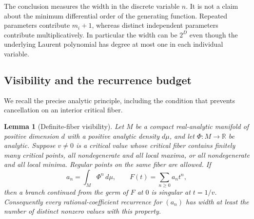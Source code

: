 \documentclass[11pt,a4paper]{article}
\newtheorem{lemma}[theorem]{Lemma}
\theoremstyle{definition}
\theoremstyle{remark}
\numberwithin{equation}{section}
\begin{document}
The conclusion measures the width in the discrete variable $n$.  It is not
a claim about the minimum differential order of the generating function.
Repeated parameters contribute $m_i+1$, whereas distinct independent
parameters contribute multiplicatively.  In particular the width can be
$2^D$ even though the underlying Laurent polynomial has degree at most one
in each individual variable.

\subsection{Visibility and the recurrence budget}

We recall the precise analytic principle, including the condition that
prevents cancellation on an interior critical fiber.

\begin{lemma}[Definite-fiber visibility]\label{p1:lem:transfer-visibility}
Let $M$ be a compact real-analytic manifold of positive dimension $d$ with
a positive analytic density $d\mu$, and let $\Phi:M\to\mathbb R$ be
analytic.  Suppose $v\ne0$ is a critical value whose critical fiber contains
finitely many critical points, all nondegenerate and all local maxima, or
all nondegenerate and all local minima.  Regular points on the same fiber
are allowed.  If
\[
 a_n=\int_M\Phi^n\,d\mu,\qquad F(t)=\sum_{n\geq0}a_nt^n,
\]
then a branch continued from the germ of $F$ at $0$ is singular at $t=1/v$.
Consequently every rational-coefficient recurrence for $(a_n)$ has width
at least the number of distinct nonzero values with this property.
\end{lemma}
\end{document}
